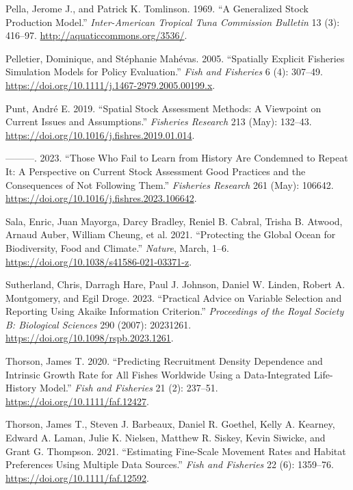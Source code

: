 \documentclass[
  default,
  lineno,
  referee]{sn-jnl}
\newlength{\cslhangindent}
\newenvironment{CSLReferences}[2] %
 {\begin{list}{}{%
  \setlength{\itemindent}{0pt}
  \setlength{\leftmargin}{0pt}
  \setlength{\parsep}{0pt}
  \ifodd #1
   \setlength{\leftmargin}{\cslhangindent}
   \setlength{\itemindent}{-1\cslhangindent}
  \fi
  \setlength{\itemsep}{#2\baselineskip}}}
 {\end{list}}
\begin{document}
\begin{CSLReferences}{1}{0}
Pella, Jerome J., and Patrick K. Tomlinson. 1969. {``A Generalized Stock
Production Model.''} \emph{Inter-American Tropical Tuna Commission
Bulletin} 13 (3): 416--97. \url{http://aquaticcommons.org/3536/}.

Pelletier, Dominique, and Stéphanie Mahévas. 2005. {``Spatially Explicit
Fisheries Simulation Models for Policy Evaluation.''} \emph{Fish and
Fisheries} 6 (4): 307--49.
\url{https://doi.org/10.1111/j.1467-2979.2005.00199.x}.

Punt, André E. 2019. {``Spatial Stock Assessment Methods: A Viewpoint on
Current Issues and Assumptions.''} \emph{Fisheries Research} 213 (May):
132--43. \url{https://doi.org/10.1016/j.fishres.2019.01.014}.

---------. 2023. {``Those Who Fail to Learn from History Are Condemned
to Repeat It: A Perspective on Current Stock Assessment Good Practices
and the Consequences of Not Following Them.''} \emph{Fisheries Research}
261 (May): 106642. \url{https://doi.org/10.1016/j.fishres.2023.106642}.

Sala, Enric, Juan Mayorga, Darcy Bradley, Reniel B. Cabral, Trisha B.
Atwood, Arnaud Auber, William Cheung, et al. 2021. {``Protecting the
Global Ocean for Biodiversity, Food and Climate.''} \emph{Nature},
March, 1--6. \url{https://doi.org/10.1038/s41586-021-03371-z}.

Sutherland, Chris, Darragh Hare, Paul J. Johnson, Daniel W. Linden,
Robert A. Montgomery, and Egil Droge. 2023. {``Practical Advice on
Variable Selection and Reporting Using Akaike Information Criterion.''}
\emph{Proceedings of the Royal Society B: Biological Sciences} 290
(2007): 20231261. \url{https://doi.org/10.1098/rspb.2023.1261}.

Thorson, James T. 2020. {``Predicting Recruitment Density Dependence and
Intrinsic Growth Rate for All Fishes Worldwide Using a Data-Integrated
Life-History Model.''} \emph{Fish and Fisheries} 21 (2): 237--51.
\url{https://doi.org/10.1111/faf.12427}.

Thorson, James T., Steven J. Barbeaux, Daniel R. Goethel, Kelly A.
Kearney, Edward A. Laman, Julie K. Nielsen, Matthew R. Siskey, Kevin
Siwicke, and Grant G. Thompson. 2021. {``Estimating Fine-Scale Movement
Rates and Habitat Preferences Using Multiple Data Sources.''} \emph{Fish
and Fisheries} 22 (6): 1359--76.
\url{https://doi.org/10.1111/faf.12592}.


\end{CSLReferences}
\end{document}
